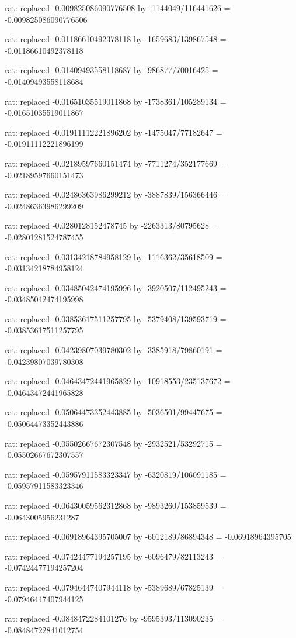 \documentclass[a4paper,10pt]{article}
\begin{document}
\begin{eulernotebook}
\begin{eulercomment}
\begin{eulercomment}
\begin{eulercomment}
\begin{eulercomment}
\begin{eulercomment}
\begin{eulercomment}
\begin{eulercomment}
\begin{eulercomment}
\begin{eulercomment}
\begin{eulercomment}
\begin{eulercomment}
\begin{eulercomment}
\begin{eulercomment}
\begin{eulercomment}
\begin{eulercomment}
\begin{eulercomment}
\begin{euleroutput}
  rat: replaced -0.009825086090776508 by -1144049/116441626 = -0.009825086090776506
  
  rat: replaced -0.01186610492378118 by -1659683/139867548 = -0.01186610492378118
  
  rat: replaced -0.01409493558118687 by -986877/70016425 = -0.01409493558118684
  
  rat: replaced -0.01651035519011868 by -1738361/105289134 = -0.01651035519011867
  
  rat: replaced -0.01911112221896202 by -1475047/77182647 = -0.01911112221896199
  
  rat: replaced -0.02189597660151474 by -7711274/352177669 = -0.02189597660151473
  
  rat: replaced -0.02486363986299212 by -3887839/156366446 = -0.02486363986299209
  
  rat: replaced -0.0280128152478745 by -2263313/80795628 = -0.02801281524787455
  
  rat: replaced -0.03134218784958129 by -1116362/35618509 = -0.03134218784958124
  
  rat: replaced -0.03485042474195996 by -3920507/112495243 = -0.03485042474195998
  
  rat: replaced -0.03853617511257795 by -5379408/139593719 = -0.03853617511257795
  
  rat: replaced -0.04239807039780302 by -3385918/79860191 = -0.04239807039780308
  
  rat: replaced -0.04643472441965829 by -10918553/235137672 = -0.04643472441965828
  
  rat: replaced -0.05064473352443885 by -5036501/99447675 = -0.05064473352443886
  
  rat: replaced -0.05502667672307548 by -2932521/53292715 = -0.05502667672307557
  
  rat: replaced -0.05957911583323347 by -6320819/106091185 = -0.05957911583323346
  
  rat: replaced -0.06430059562312868 by -9893260/153859539 = -0.0643005956231287
  
  rat: replaced -0.06918964395705007 by -6012189/86894348 = -0.06918964395705
  
  rat: replaced -0.07424477194257195 by -6096479/82113243 = -0.07424477194257204
  
  rat: replaced -0.07946447407944118 by -5389689/67825139 = -0.07946447407944125
  
  rat: replaced -0.0848472284101276 by -9595393/113090235 = -0.08484722841012754
  

\end{euleroutput}
\end{eulercomment}
\end{eulercomment}
\end{eulercomment}
\end{eulercomment}
\end{eulercomment}
\end{eulercomment}
\end{eulercomment}
\end{eulercomment}
\end{eulercomment}
\end{eulercomment}
\end{eulercomment}
\end{eulercomment}
\end{eulercomment}
\end{eulercomment}
\end{eulercomment}
\end{eulercomment}
\end{eulernotebook}
\end{document}
